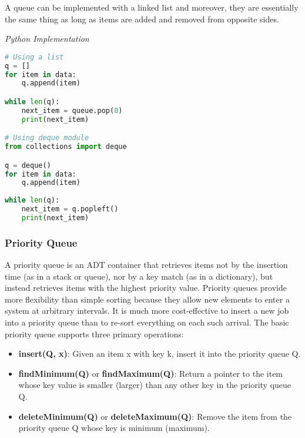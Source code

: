 \documentclass{article}
\begin{document}
    A queue can be implemented with a linked list and moreover, they are essentially the same thing as long as items are added and removed from opposite sides.
    
\vspace{8pt} \emph{Python Implementation}
\begin{lstlisting}[language=Python]
# Using a list 
q = []
for item in data:
    q.append(item) 

while len(q):
    next_item = queue.pop(0)
    print(next_item)

# Using deque module 
from collections import deque 

q = deque() 
for item in data:
    q.append(item) 
 
while len(q):
    next_item = q.popleft() 
    print(next_item)

\end{lstlisting}
    
    \subsubsection{Priority Queue}
    A priority queue is an ADT container that retrieves items not by the insertion time (as in a stack or queue), nor by a key match (as in a dictionary), but instead retrieves items with the highest priority value. Priority queues provide more flexibility than simple sorting because they allow new elements to enter a system at arbitrary intervals. It is much more cost-effective to insert a new job into a priority queue than to re-sort everything on each such arrival. The basic priority queue supports three primary operations:
    \begin{itemize}
        \item \textbf{insert(Q, x)}: Given an item x with key k, insert it into the priority queue Q.
        \item \textbf{findMinimum(Q)} or \textbf{findMaximum(Q)}: Return a pointer to the item whose key value is smaller (larger) than any other key in the priority queue Q.
        \item \textbf{deleteMinimum(Q)} or \textbf{deleteMaximum(Q)}: Remove the item from the priority queue Q whose key is minimum (maximum).
    \end{itemize}
\end{document}
